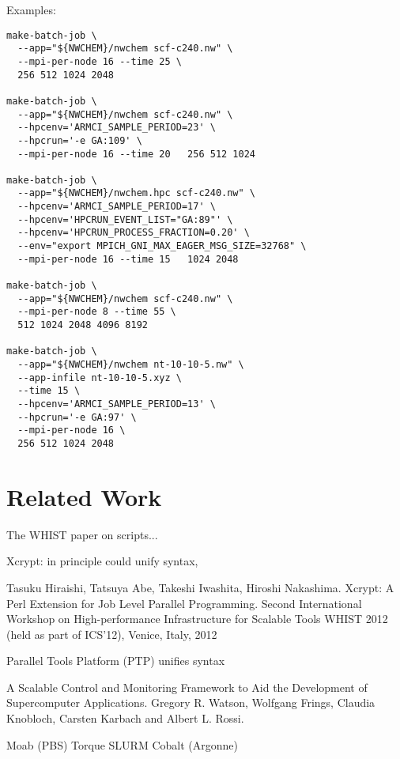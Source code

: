 Examples:
\begin{verbatim}
make-batch-job \
  --app="${NWCHEM}/nwchem scf-c240.nw" \
  --mpi-per-node 16 --time 25 \
  256 512 1024 2048

make-batch-job \
  --app="${NWCHEM}/nwchem scf-c240.nw" \
  --hpcenv='ARMCI_SAMPLE_PERIOD=23' \
  --hpcrun='-e GA:109' \
  --mpi-per-node 16 --time 20   256 512 1024

make-batch-job \
  --app="${NWCHEM}/nwchem.hpc scf-c240.nw" \
  --hpcenv='ARMCI_SAMPLE_PERIOD=17' \
  --hpcenv='HPCRUN_EVENT_LIST="GA:89"' \
  --hpcenv='HPCRUN_PROCESS_FRACTION=0.20' \
  --env="export MPICH_GNI_MAX_EAGER_MSG_SIZE=32768" \
  --mpi-per-node 16 --time 15   1024 2048

make-batch-job \
  --app="${NWCHEM}/nwchem scf-c240.nw" \
  --mpi-per-node 8 --time 55 \
  512 1024 2048 4096 8192

make-batch-job \
  --app="${NWCHEM}/nwchem nt-10-10-5.nw" \
  --app-infile nt-10-10-5.xyz \
  --time 15 \
  --hpcenv='ARMCI_SAMPLE_PERIOD=13' \
  --hpcrun='-e GA:97' \
  --mpi-per-node 16 \
  256 512 1024 2048
\end{verbatim}



\section{Related Work}
\label{sec:related-work}

The WHIST paper on scripts... \cite{Xcrypt}

Xcrypt: in principle could unify syntax, 

Tasuku Hiraishi, Tatsuya Abe, Takeshi Iwashita, Hiroshi Nakashima.
Xcrypt: A Perl Extension for Job Level Parallel Programming.
Second International Workshop on High-performance Infrastructure for Scalable Tools WHIST 2012 (held as part of ICS'12), Venice, Italy, 2012


Parallel Tools Platform (PTP) unifies syntax

A Scalable Control and Monitoring Framework to Aid the Development of Supercomputer Applications.
Gregory R. Watson, Wolfgang Frings, Claudia Knobloch, Carsten Karbach and Albert L. Rossi.


Moab (PBS)
Torque
SLURM
Cobalt (Argonne)

